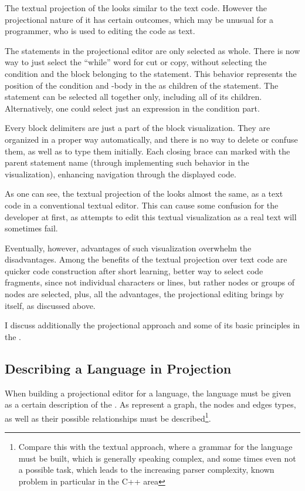 The textual projection of the  looks similar to the text code. However the projectional 
nature of it has certain outcomes, which may be unusual for a programmer, who is used to editing
the code as text.

The statements in the projectional editor are only selected as whole. There is now way to just select 
the ``while'' word for cut or copy, without selecting the condition and the block belonging to the statement. 
This behavior represents the position of the condition and -body in the  as children of the  
statement. The statement can be selected all together only, including all of its children. Alternatively, one could 
select just an expression in the condition part.

Every block delimiters are just a part of the block visualization. They are organized in a proper way
automatically, and there is no way to delete or confuse them, as well as to type them initially. Each
closing brace can marked with the parent statement name (through implementing such behavior in the
 visualization), enhancing navigation through the displayed code.

As one can see, the textual projection of the  looks almost the same, as a text code in a 
conventional textual editor. This can cause some confusion for the developer at first, 
as attempts to edit this textual visualization as a real text will sometimes fail. 

Eventually, however, advantages of such visualization overwhelm the disadvantages. 
Among the benefits of the textual projection over text code are quicker code construction 
after short learning, better way to select code fragments, since not individual 
characters or lines, but rather  nodes or groups of nodes are selected, 
plus, all the advantages, the projectional editing brings by itself, as discussed above.

I discuss additionally the projectional approach and some of its basic 
principles in the .


\subsection{Describing a Language in Projection}

When  building a projectional editor for a language, the language must be given as a certain description of the .
As  represent a graph, the nodes and edges types, as well as their possible relationships must be described\footnote{Compare this
with the textual approach, where a grammar for the language must be built, which is generally speaking complex, and some times even not a
possible task, which leads to the increasing parser complexity, known problem in particular in the C++ area}. 

